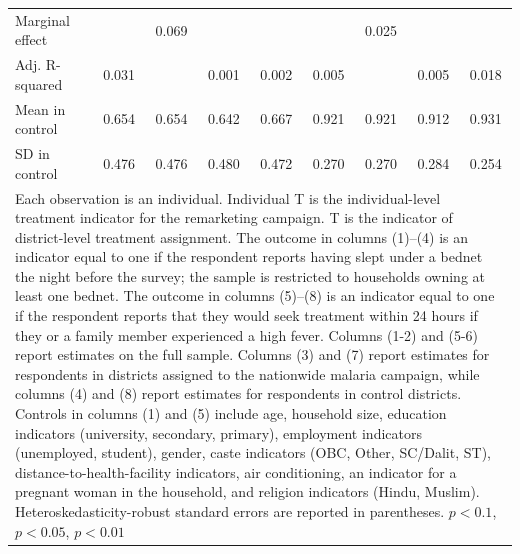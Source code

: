 {{\begin{tabular}{l*{8}{c}}
Marginal effect &                  &    0.069         &                  &                  &                  &    0.025         &                  &                  \\
Adj. R-squared  &    0.031         &                  &    0.001         &    0.002         &    0.005         &                  &    0.005         &    0.018         \\
Mean in control &    0.654         &    0.654         &    0.642         &    0.667         &    0.921         &    0.921         &    0.912         &    0.931         \\
SD in control   &    0.476         &    0.476         &    0.480         &    0.472         &    0.270         &    0.270         &    0.284         &    0.254         \\
\hline\hline
\multicolumn{9}{p{.95\linewidth}}{\scriptsize Each observation is an individual. Individual T is the individual-level treatment indicator for the remarketing campaign. T is the indicator of district-level treatment assignment. The outcome in columns (1)--(4) is an indicator equal to one if the respondent reports having slept under a bednet the night before the survey; the sample is restricted to households owning at least one bednet. The outcome in columns (5)--(8) is an indicator equal to one if the respondent reports that they would seek treatment within 24 hours if they or a family member experienced a high fever.  Columns (1-2) and (5-6) report estimates on the full sample. Columns (3) and (7) report estimates for respondents in districts assigned to the nationwide malaria campaign, while columns (4) and (8) report estimates for respondents in control districts. Controls in columns (1) and (5) include age, household size, education indicators (university, secondary, primary), employment indicators (unemployed, student), gender, caste indicators (OBC, Other, SC/Dalit, ST), distance-to-health-facility indicators, air conditioning, an indicator for a pregnant woman in the household, and religion indicators (Hindu, Muslim).   Heteroskedasticity-robust standard errors are reported in parentheses.  \sym{*} \(p<0.1\), \sym{**} \(p<0.05\), \sym{***} \(p<0.01\)}\\
\end{tabular}
}%

}
